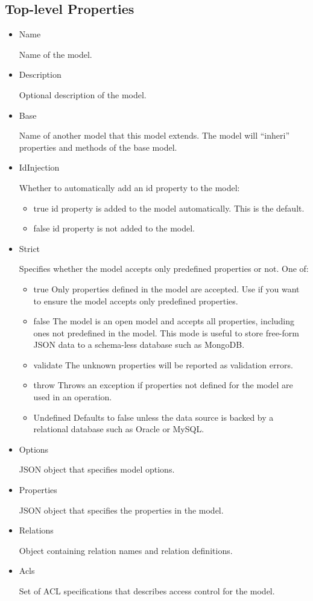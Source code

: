 \subsection{Top-level Properties}
\begin{itemize}
\item Name

Name of the model.

\item Description

Optional description of the model.

\item Base

Name of another model that this model extends. The model will ``inheri'' properties and methods of the base model.

\item IdInjection

Whether to automatically add an id property to the model:
\begin{itemize}
\item true id property is added to the model automatically. This is the default.
\item false id property is not added to the model.
\end{itemize}

\item Strict

Specifies whether the model accepts only predefined properties or not. One of:
\begin{itemize}
\item true Only properties defined in the model are accepted. Use if you want to ensure the model accepts only predefined properties.
\item false The model is an open model and accepts all properties, including ones not predefined in the model. This mode is useful to store free-form JSON data to a schema-less database such as MongoDB.
\item validate The unknown properties will be reported as validation errors.
\item throw Throws an exception if properties not defined for the model are used in an operation.
\item Undefined Defaults to false unless the data source is backed by a relational database such as Oracle or MySQL.
\end{itemize}

\item Options

JSON object that specifies model options.

\item Properties

JSON object that specifies the properties in the model.

\item Relations

Object containing relation names and relation definitions.

\item Acls

Set of ACL specifications that describes access control for the model.

\end{itemize}

